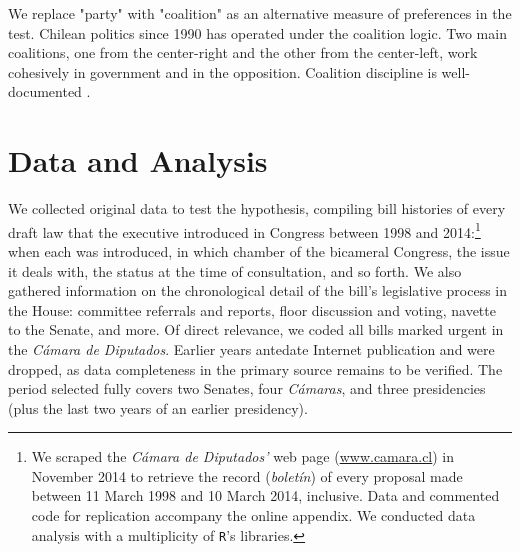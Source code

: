 \documentclass[letter,12pt]{article}
\begin{document}
We replace "party" with "coalition" as an alternative measure of preferences in the test. Chilean politics since 1990 has operated under the coalition logic. Two main coalitions, one from the center-right and the other from the center-left, work cohesively in government and in the opposition. Coalition discipline is well-documented \citep{carey.2002,aleman.saiegh.coalUnityChile.2007}. 


\section*{Data and Analysis}

We collected original data to test the hypothesis, compiling bill histories of every draft law that the executive introduced in Congress between 1998 and 2014:\footnote{We scraped the \emph{Cámara de Diputados'} web page (\url{www.camara.cl}) in November 2014 to retrieve the record (\emph{boletín}) of every proposal made between 11 March 1998 and 10 March 2014, inclusive. Data and commented code for replication accompany the online appendix. We conducted data analysis with a multiplicity of \texttt{R}'s libraries.} when each was introduced, in which chamber of the bicameral Congress, the issue it deals with, the status at the time of consultation, and so forth. We also gathered information on the chronological detail of the bill's legislative process in the House: committee referrals and reports, floor discussion and voting, navette to the Senate, and more. Of direct relevance, we coded all bills marked urgent in the \emph{Cámara de Diputados}. Earlier years antedate Internet publication and were dropped, as data completeness in the primary source remains to be verified. The period selected fully covers two Senates, four \emph{Cámaras}, and three presidencies (plus the last two years of an earlier presidency).


\end{document}
